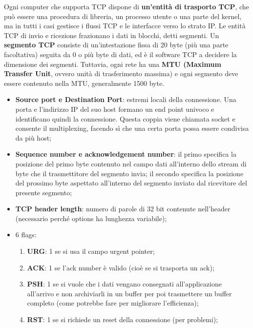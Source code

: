 \documentclass{article}
\begin{document}
        Ogni computer che supporta TCP dispone di \textbf{un’entità di trasporto TCP}, che può essere una
        procedura di libreria, un processo utente o una parte del kernel, ma in tutti i casi gestisce i flussi
        TCP e le interfacce verso lo strato IP. Le entità TCP di invio e ricezione frazionano i dati in
        blocchi, detti segmenti. Un \textbf{segmento TCP} consiste di un’intestazione fissa di 20 byte (più una
        parte facoltativa) seguita da 0 o più byte di dati, ed è il software TCP a decidere la dimensione
        dei segmenti. Tuttavia, ogni rete ha una \textbf{MTU (Maximum Transfer Unit}, ovvero unità di
        trasferimento massima) e ogni segmento deve essere contenuto nella MTU, generalmente 1500
        byte.
        \begin{itemize}
            \item \textbf{Source port e Destination Port}: estremi locali della connessione. Una porta e
            l’indirizzo IP del suo host formano un end point univoco e identificano quindi la
            connessione. Questa coppia viene chiamata socket e consente il multiplexing, facendo
            sì che una certa porta possa essere condivisa da più host;
            \item \textbf{Sequence number e acknowledgement number}: il primo specifica la posizione del
            primo byte contenuto nel campo dati all’interno dello stream di byte che il trasmettitore
            del segmento invia; il secondo specifica la posizione del prossimo byte aspettato
            all’interno del segmento inviato dal ricevitore del presente segmento;
            \item \textbf{TCP header length}: numero di parole di 32 bit contenute nell’header (necessario
            perché options ha lunghezza variabile);
            \item 6 flags: 
                \begin{enumerate}
                    \item \textbf{URG}: 1 se si usa il campo urgent pointer;
                    \item \textbf{ACK}: 1 se l’ack number è valido (cioè se si trasporta un ack);
                    \item \textbf{PSH}: 1 se si vuole che i dati vengano consegnati all’applicazione all’arrivo e non
                    archiviarli in un buffer per poi trasmettere un buffer completo (come potrebbe
                    fare per migliorare l’efficienza);
                    \item \textbf{RST}: 1 se si richiede un reset della connessione (per problemi);

\end{enumerate}
\end{itemize}
\end{document}
